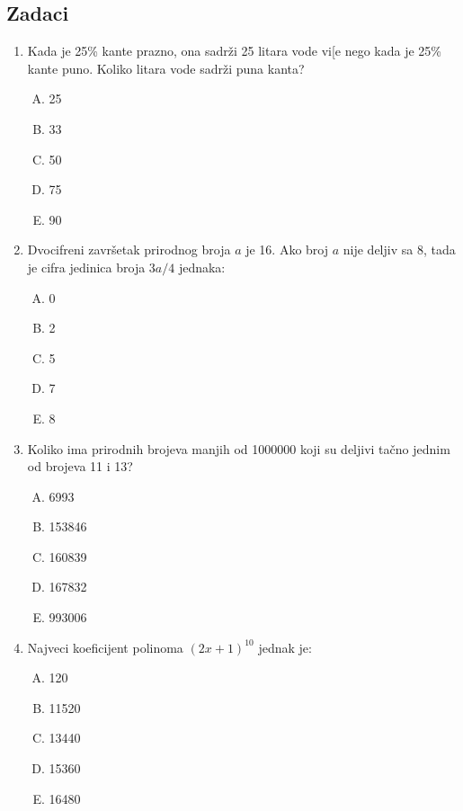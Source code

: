 \documentclass[a4paper,12pt]{report}
\begin{document}
\subsection*{Zadaci}

\begin{enumerate}[1.]
\item Kada je 25\% kante prazno, ona sadr\v{z}i 25 litara vode vi[e nego kada je 25\% kante puno. Koliko litara vode sadr\v{z}i puna kanta?
\begin{multicols}{5}
\begin{enumerate}[A)]
\item 25 \item 33 \item 50 \item 75 \item 90
\end{enumerate}
\end{multicols}

\item Dvocifreni zavr\v{s}etak prirodnog broja $a$ je 16. Ako broj $a$ nije deljiv sa 8, tada je cifra jedinica broja $3a/4$ jednaka:
\begin{multicols}{5}
\begin{enumerate}[A)]
\item 0 \item 2 \item 5 \item 7 \item 8
\end{enumerate}
\end{multicols}

\item Koliko ima prirodnih brojeva manjih od 1000000 koji su deljivi ta\v{c}no jednim od brojeva 11 i 13?
\begin{multicols}{5}
\begin{enumerate}[A)]
\item 6993 \item 153846 \item 160839 \item 167832 \item 993006
\end{enumerate}
\end{multicols}

\item Najveci koeficijent polinoma $(2x + 1)^{10} $ jednak je:
\begin{multicols}{5}
\begin{enumerate}[A)]
\item 120 \item 11520 \item 13440 \item 15360 \item 16480
\end{enumerate}
\end{multicols} 


\end{enumerate}
\end{document}

